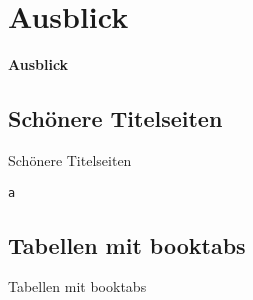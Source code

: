 \documentclass["WS\space 16-17\space -\space LaTeX-Kurs\space -\space Praesentation\space -\space 4.tex"]{subfiles}
\begin{document}
\section{Ausblick}
\begin{frame}[c]
	\begin{center}
		\LARGE \textbf{Ausblick}
	\end{center}
\end{frame}
\subsection{Schönere Titelseiten}
\begin{frame}[c]
	\begin{center}
		\large Schönere Titelseiten
	\end{center}
\end{frame}
\begin{frame}[fragile]
	\Ausgabe
	\begin{outputbox}
		
	\end{outputbox}

	\pause\Code
	\begin{lstlisting}
a
	\end{lstlisting}
\end{frame}
\subsection{Tabellen mit booktabs}
\begin{frame}[c]
	\begin{center}
		\large Tabellen mit booktabs
	\end{center}
\end{frame}
\end{document}
